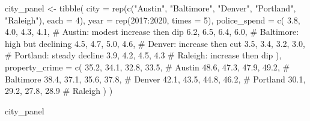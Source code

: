 \documentclass[
  letterpaper,
  DIV=11,
  numbers=noendperiod]{scrreprt}
\newenvironment{Shaded}{\begin{snugshade}}{\end{snugshade}}
\newcommand{\AttributeTok}[1]{\textcolor[rgb]{0.40,0.45,0.13}{#1}}
\newcommand{\CommentTok}[1]{\textcolor[rgb]{0.37,0.37,0.37}{#1}}
\newcommand{\DecValTok}[1]{\textcolor[rgb]{0.68,0.00,0.00}{#1}}
\newcommand{\FloatTok}[1]{\textcolor[rgb]{0.68,0.00,0.00}{#1}}
\newcommand{\FunctionTok}[1]{\textcolor[rgb]{0.28,0.35,0.67}{#1}}
\newcommand{\NormalTok}[1]{\textcolor[rgb]{0.00,0.23,0.31}{#1}}
\newcommand{\OtherTok}[1]{\textcolor[rgb]{0.00,0.23,0.31}{#1}}
\newcommand{\SpecialCharTok}[1]{\textcolor[rgb]{0.37,0.37,0.37}{#1}}
\newcommand{\StringTok}[1]{\textcolor[rgb]{0.13,0.47,0.30}{#1}}
\begin{document}
\begin{Shaded}
\begin{Highlighting}[]
\NormalTok{city\_panel }\OtherTok{\textless{}{-}} \FunctionTok{tibble}\NormalTok{(}
    \AttributeTok{city =} \FunctionTok{rep}\NormalTok{(}\FunctionTok{c}\NormalTok{(}\StringTok{"Austin"}\NormalTok{, }\StringTok{"Baltimore"}\NormalTok{, }\StringTok{"Denver"}\NormalTok{, }\StringTok{"Portland"}\NormalTok{, }\StringTok{"Raleigh"}\NormalTok{), }\AttributeTok{each =} \DecValTok{4}\NormalTok{),}
    \AttributeTok{year =} \FunctionTok{rep}\NormalTok{(}\DecValTok{2017}\SpecialCharTok{:}\DecValTok{2020}\NormalTok{, }\AttributeTok{times =} \DecValTok{5}\NormalTok{),}
    \AttributeTok{police\_spend =} \FunctionTok{c}\NormalTok{(}
        \FloatTok{3.8}\NormalTok{, }\FloatTok{4.0}\NormalTok{, }\FloatTok{4.3}\NormalTok{, }\FloatTok{4.1}\NormalTok{,   }\CommentTok{\# Austin: modest increase then dip}
        \FloatTok{6.2}\NormalTok{, }\FloatTok{6.5}\NormalTok{, }\FloatTok{6.4}\NormalTok{, }\FloatTok{6.0}\NormalTok{,   }\CommentTok{\# Baltimore: high but declining}
        \FloatTok{4.5}\NormalTok{, }\FloatTok{4.7}\NormalTok{, }\FloatTok{5.0}\NormalTok{, }\FloatTok{4.6}\NormalTok{,   }\CommentTok{\# Denver: increase then cut}
        \FloatTok{3.5}\NormalTok{, }\FloatTok{3.4}\NormalTok{, }\FloatTok{3.2}\NormalTok{, }\FloatTok{3.0}\NormalTok{,   }\CommentTok{\# Portland: steady decline}
        \FloatTok{3.9}\NormalTok{, }\FloatTok{4.2}\NormalTok{, }\FloatTok{4.5}\NormalTok{, }\FloatTok{4.3}    \CommentTok{\# Raleigh: increase then dip}
\NormalTok{    ),}
    \AttributeTok{property\_crime =} \FunctionTok{c}\NormalTok{(}
        \FloatTok{35.2}\NormalTok{, }\FloatTok{34.1}\NormalTok{, }\FloatTok{32.8}\NormalTok{, }\FloatTok{33.5}\NormalTok{,   }\CommentTok{\# Austin}
        \FloatTok{48.6}\NormalTok{, }\FloatTok{47.3}\NormalTok{, }\FloatTok{47.9}\NormalTok{, }\FloatTok{49.2}\NormalTok{,   }\CommentTok{\# Baltimore}
        \FloatTok{38.4}\NormalTok{, }\FloatTok{37.1}\NormalTok{, }\FloatTok{35.6}\NormalTok{, }\FloatTok{37.8}\NormalTok{,   }\CommentTok{\# Denver}
        \FloatTok{42.1}\NormalTok{, }\FloatTok{43.5}\NormalTok{, }\FloatTok{44.8}\NormalTok{, }\FloatTok{46.2}\NormalTok{,   }\CommentTok{\# Portland}
        \FloatTok{30.1}\NormalTok{, }\FloatTok{29.2}\NormalTok{, }\FloatTok{27.8}\NormalTok{, }\FloatTok{28.9}    \CommentTok{\# Raleigh}
\NormalTok{    )}
\NormalTok{)}

\NormalTok{city\_panel}
\end{Highlighting}
\end{Shaded}
\end{document}
